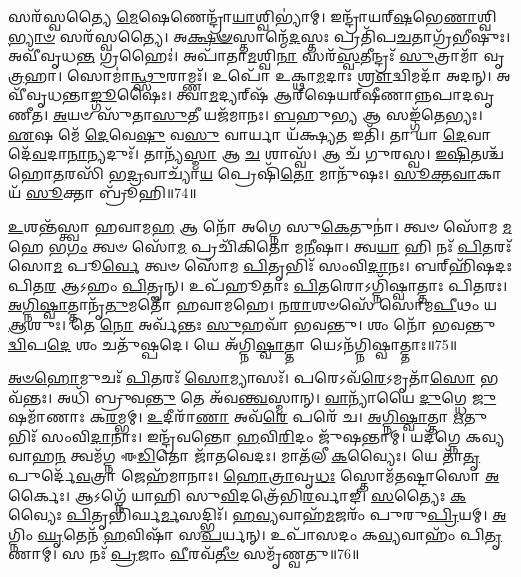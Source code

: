 𑌸𑌰᳴𑌸𑍍𑌵𑌤𑍍𑌯𑍈 \ul{𑌮𑍇}\-𑌷𑍇𑌣𑍇𑌨𑍍𑌦𑍍𑌰𑌾᳴\-\ul{𑌯𑌾}\-𑌶𑍍𑌵𑌿𑌭𑍍𑌯𑌾॑𑌮𑍍।
𑌇𑌨𑍍𑌦𑍍𑌰𑌾᳴𑌯𑌰𑍍‌\mbox{}\-\ul{𑌷}\-𑌭𑍇\-\ul{𑌣𑌾}\-𑌶𑍍𑌵𑌿\-\ul{𑌭𑍍𑌯𑌾}\-\-\ul{𑍞} 𑌸𑌰᳴𑌸𑍍𑌵𑌤𑍍𑌯𑍈।
𑌅\-\ul{𑌕𑍍𑌷}\-\-\ul{𑍟}\-𑌸𑍍𑌤𑌾𑌨𑍍𑌮𑍇᳴\-\ul{𑌦}\-𑌸𑍍𑌤𑌃 𑌪𑍍𑌰𑌤𑌿᳴\-𑌪\-\ul{𑌚}\-𑌤𑌾𑌗𑍍𑌰᳴𑌭𑍀𑌷𑍁𑌃।
𑌅𑌵𑍀᳴𑌵𑍃𑌧\-\ul{𑌨𑍍𑌤} 𑌗𑍍𑌰𑌹𑍈𑌃॑।
𑌅𑌪𑌾᳴𑌤𑌾\-\ul{𑌮}\-𑌶𑍍𑌵𑌿\-\ul{𑌨𑌾} 𑌸𑌰᳴\-\ul{𑌸𑍍𑌵}\-𑌤𑍀𑌨𑍍𑌦𑍍𑌰𑌃᳴ \ul{𑌸𑍁}\-𑌤𑍍𑌰𑌾𑌮𑌾᳴ 𑌵𑍃\-\ul{𑌤𑍍𑌰}\-𑌹𑌾।
𑌸𑍋𑌮𑌾॑\-\ul{𑌨𑍍𑌥𑍍𑌸𑍁}\-𑌰𑌾𑌮𑍍𑌣𑌃᳴।
𑌉𑌪𑍋᳴ 𑌉𑌕𑍍𑌥𑌾\-\ul{𑌮}\-𑌦𑌾𑌃 \ul{𑌶𑍍𑌰𑍗}\-𑌦𑍍𑌵𑌿𑌮𑌦𑌾᳴ 𑌅𑌦𑌨𑍍।
𑌅𑌵𑍀᳴𑌵𑍃𑌧𑌨𑍍𑌤𑌾\-\ul{𑌙𑍍𑌗𑍂}\-𑌷𑍈𑌃।
𑌤𑍍𑌵𑌾\-\ul{𑌮}\-𑌦𑍍𑌯𑌰𑍍‌\mbox{}𑌷᳴ 𑌆𑌰𑍍‌\mbox{}𑌷𑍇𑌯𑌰𑍍‌\mbox{}𑌷𑍀𑌣𑌾𑌨𑍍𑌨𑌪𑌾𑌦𑌵𑍃𑌣𑍀𑌤।
\-\ul{𑌅}\-𑌯𑍞 𑌸𑍁᳴𑌤𑌾\-\ul{𑌸𑍁}\-𑌤𑍀 𑌯𑌜᳴𑌮𑌾𑌨𑌃।
\-\ul{𑌬}\-𑌹𑍁\-\ul{𑌭𑍍𑌯} 𑌆 𑌸𑌙𑍍𑌗᳴𑌤𑍇𑌭𑍍𑌯𑌃।
\-\ul{𑌏}\-𑌷 𑌮𑍇᳴ \ul{𑌦𑍇}\-𑌵𑍇\-\ul{𑌷𑍁} 𑌵\-\ul{𑌸𑍁} 𑌵𑌾𑌰𑍍𑌯𑌾 𑌯᳴𑌕𑍍𑌷𑍍𑌯\-\ul{𑌤} 𑌇𑌤𑌿᳴।
𑌤𑌾 𑌯𑌾 \ul{𑌦𑍇}\-𑌵𑌾 𑌦𑍇᳴\-\ul{𑌵}\-𑌦𑌾\-\ul{𑌨𑌾}\-𑌨𑍍𑌯𑌦𑍁𑌃᳴।
𑌤𑌾𑌨𑍍𑌯᳴\-\ul{𑌸𑍍𑌮𑌾} 𑌆 \ul{𑌚} 𑌶𑌾𑌸𑍍𑌵᳴।
𑌆 𑌚᳴ 𑌗𑍁𑌰𑌸𑍍𑌵।
\-\ul{𑌇}\-\-\ul{𑌷𑌿}\-𑌤𑌶𑍍𑌚᳴ 𑌹𑍋\-\ul{𑌤}\-𑌰𑌸𑌿᳴ 𑌭\-\ul{𑌦𑍍𑌰}\-𑌵𑌾𑌚𑍍𑌯𑌾᳴\-\ul{𑌯} 𑌪𑍍𑌰𑍇𑌷𑌿᳴\-\ul{𑌤𑍋} 𑌮𑌾𑌨𑍁᳴𑌷𑌃।
\-\ul{𑌸𑍂}\-\-\ul{𑌕𑍍𑌤}\-\-\ul{𑌵𑌾}\-𑌕𑌾𑌯᳴ \ul{𑌸𑍂}\-𑌕𑍍𑌤𑌾 𑌬𑍍𑌰𑍂᳴𑌹𑌿॥74॥\anuvakamend[𑌇𑌨𑍍𑌦𑍍𑌰𑌾᳴\-\ul{𑌯} 𑌯𑌜᳴𑌮𑌾𑌨𑌃 \ul{𑌸}\-𑌪𑍍𑌤 𑌚᳴]

\-\ul{𑌉}\-𑌶𑌨𑍍𑌤᳴𑌸𑍍𑌤𑍍𑌵𑌾 𑌹𑌵𑌾𑌮\-\ul{𑌹} 𑌆 𑌨𑍋᳴ 𑌅𑌗𑍍𑌨𑍇 𑌸𑍁\-\ul{𑌕𑍇}\-𑌤𑍁𑌨𑌾॑।
𑌤𑍍𑌵𑍞 𑌸𑍋᳴𑌮 \ul{𑌮}\-𑌹𑍇 𑌭\-\ul{𑌗𑌂} 𑌤𑍍𑌵𑍞 𑌸𑍋᳴\-\ul{𑌮} 𑌪𑍍𑌰𑌚𑌿᳴𑌕𑌿𑌤𑍋 𑌮\-\ul{𑌨𑍀}\-𑌷𑌾।
𑌤𑍍𑌵\-\ul{𑌯𑌾} 𑌹𑌿 𑌨𑌃᳴ \ul{𑌪𑌿}\-𑌤𑌰𑌃᳴ 𑌸𑍋\-\ul{𑌮} 𑌪𑍂\-\ul{𑌰𑍍𑌵𑍇} 𑌤𑍍𑌵𑍞 𑌸𑍋᳴𑌮 \ul{𑌪𑌿}\-𑌤𑍃𑌭𑌿𑌃᳴ 𑌸𑌂𑌵𑌿\-\ul{𑌦𑌾}\-𑌨𑌃।
𑌬𑌰𑍍‌\mbox{}𑌹𑌿᳴𑌷𑌦𑌃 𑌪𑌿𑌤\-\ul{𑌰} 𑌆𑌽𑌹𑌂 \ul{𑌪𑌿}\-𑌤𑍄𑌨𑍍।
𑌉𑌪᳴𑌹𑍂𑌤𑌾𑌃 \ul{𑌪𑌿}\-𑌤𑌰𑍋\-𑌽𑌗𑍍𑌨𑌿᳴𑌷𑍍𑌵𑌾𑌤𑍍𑌤𑌾𑌃 𑌪𑌿𑌤𑌰𑌃।
\-\ul{𑌅}\-\-\ul{𑌗𑍍𑌨𑌿}\-\-\ul{𑌷𑍍𑌵𑌾}\-𑌤𑍍𑌤𑌾𑌨𑍃᳴\-\ul{𑌤𑍁}\-𑌮𑌤𑍋᳴ 𑌹𑌵𑌾𑌮𑌹𑍇।
𑌨\-\ul{𑌰𑌾}\-𑌶𑍞𑌸𑍇᳴ 𑌸𑍋𑌮\-\ul{𑌪𑍀}\-𑌥𑌂 𑌯 \ul{𑌆}\-𑌶𑍁𑌃।
𑌤𑍇 \ul{𑌨𑍋} 𑌅𑌰𑍍𑌵᳴𑌨𑍍𑌤𑌃 \ul{𑌸𑍁}\-𑌹𑌵𑌾᳴ 𑌭𑌵𑌨𑍍𑌤𑍁।
𑌶𑌂 𑌨𑍋᳴ 𑌭𑌵𑌨𑍍𑌤𑍁 \ul{𑌦𑍍𑌵𑌿}\-𑌪\-\ul{𑌦𑍇} 𑌶𑌂 𑌚𑌤𑍁᳴𑌷𑍍𑌪𑌦𑍇।
𑌯𑍇 𑌅᳴𑌗𑍍𑌨𑌿\-\ul{𑌷𑍍𑌵𑌾}\-𑌤𑍍𑌤𑌾 𑌯𑍇𑌽𑌨᳴𑌗𑍍𑌨𑌿𑌷𑍍𑌵𑌾𑌤𑍍𑌤𑌾𑌃॥75॥

\-\ul{𑌅}\-\-\ul{𑍞}\-\-\ul{𑌹𑍋}\-𑌮𑍁𑌚𑌃᳴ \ul{𑌪𑌿}\-𑌤𑌰𑌃᳴ \ul{𑌸𑍋}\-𑌮𑍍𑌯𑌾𑌸𑌃᳴।
𑌪𑌰𑍇𑌽𑌵᳴\-\ul{𑌰𑍇}\-\-𑌽𑌮𑍃𑌤𑌾᳴\-\ul{𑌸𑍋} 𑌭𑌵᳴𑌨𑍍𑌤𑌃।
𑌅𑌧𑌿᳴ 𑌬𑍍𑌰𑍁𑌵\-\ul{𑌨𑍍𑌤𑍁} 𑌤𑍇 𑌅᳴𑌵\-\ul{𑌨𑍍𑌤𑍍𑌵}\-𑌸𑍍𑌮𑌾𑌨𑍍।
\-\ul{𑌵𑌾}\-𑌨𑍍𑌯𑌾᳴𑌯𑍈 \ul{𑌦𑍁}\-𑌗𑍍𑌧𑍇 \ul{𑌜𑍁}\-𑌷𑌮𑌾᳴𑌣𑌾𑌃 𑌕\-\ul{𑌰}\-𑌮𑍍𑌭𑌮𑍍।
\-\ul{𑌉}\-𑌦𑍀𑌰𑌾᳴\-\ul{𑌣𑌾} 𑌅𑌵᳴\-\ul{𑌰𑍇} 𑌪𑌰𑍇᳴ 𑌚।
\-\ul{𑌅}\-\-\ul{𑌗𑍍𑌨𑌿}\-\-\ul{𑌷𑍍𑌵𑌾}\-𑌤𑍍𑌤𑌾 \ul{𑌋}\-𑌤𑍁𑌭𑌿𑌃᳴ 𑌸𑌂𑌵𑌿\-\ul{𑌦𑌾}\-𑌨𑌾𑌃।
𑌇𑌨𑍍𑌦𑍍𑌰᳴𑌵𑌨𑍍𑌤𑍋 \ul{𑌹}\-𑌵𑌿\-\ul{𑌰𑌿}\-𑌦𑌂 𑌜𑍁᳴𑌷𑌨𑍍𑌤𑌾𑌮𑍍।
𑌯𑌦᳴𑌗𑍍𑌨𑍇 𑌕𑌵𑍍𑌯𑌵𑌾𑌹\-\ul{𑌨} 𑌤𑍍𑌵𑌮᳴𑌗𑍍𑌨 𑌈\-\ul{𑌡𑌿}\-𑌤𑍋 𑌜𑌾᳴𑌤𑌵𑍇𑌦𑌃।
𑌮𑌾𑌤᳴𑌲𑍀 \ul{𑌕}\-𑌵𑍍𑌯𑍈𑌃।
𑌯𑍇 𑌤𑌾᳴\-\ul{𑌤𑍃}\-𑌪𑍁𑌰𑍍𑌦𑍇᳴\-\ul{𑌵}\-𑌤𑍍𑌰𑌾 𑌜𑍇𑌹᳴𑌮𑌾𑌨𑌾𑌃।
\-\ul{𑌹𑍋}\-\-\ul{𑌤𑍍𑌰𑌾}\-𑌵𑍃\-\ul{𑌧𑌃} 𑌸𑍍𑌤𑍋𑌮᳴𑌤𑌷𑍍𑌟𑌾𑌸𑍋 \ul{𑌅}\-𑌰𑍍𑌕𑍈𑌃।
𑌆𑌽𑌗𑍍𑌨𑍇᳴ 𑌯𑌾𑌹𑌿 𑌸𑍁\-\ul{𑌵𑌿}\-𑌦𑌤𑍍𑌰𑍇᳴𑌭𑌿\-\ul{𑌰}\-𑌰𑍍𑌵𑌾𑌙𑍍।
\-\ul{𑌸}\-𑌤𑍍𑌯𑍈𑌃 \ul{𑌕}\-𑌵𑍍𑌯𑍈𑌃 \ul{𑌪𑌿}\-𑌤𑍃𑌭𑌿᳴𑌰𑍍𑌘\-\ul{𑌰𑍍𑌮}\-𑌸𑌦𑍍𑌭𑌿𑌃᳴।
\-\ul{𑌹}\-\-\ul{𑌵𑍍𑌯}\-𑌵𑌾𑌹᳴\-\ul{𑌮}\-𑌜𑌰𑌂᳴ 𑌪𑍁𑌰𑍁\-\ul{𑌪𑍍𑌰𑌿}\-𑌯𑌮𑍍।
\-\ul{𑌅}\-𑌗𑍍𑌨𑌿𑌂 \ul{𑌘𑍃}\-𑌤𑍇𑌨᳴ \ul{𑌹}\-𑌵𑌿𑌷𑌾᳴ 𑌸\-\ul{𑌪}\-𑌰𑍍𑌯𑌨𑍍।
𑌉𑌪𑌾᳴𑌸𑌦𑌂 𑌕\-\ul{𑌵𑍍𑌯}\-𑌵𑌾𑌹𑌂᳴ 𑌪𑌿\-\ul{𑌤𑍃}\-𑌣𑌾𑌮𑍍।
𑌸 𑌨𑌃᳴ \ul{𑌪𑍍𑌰}\-𑌜𑌾𑌂 \ul{𑌵𑍀}\-𑌰𑌵᳴\-\ul{𑌤𑍀}\-\-\ul{𑍞} 𑌸𑌮𑍃᳴𑌣𑍍𑌵𑌤𑍁॥76॥\anuvakamend[𑌅𑌨᳴𑌗𑍍𑌨𑌿𑌷𑍍𑌵𑌾\-\ul{𑌤𑍍𑌤𑌾} 𑌜𑍇𑌹᳴𑌮𑌾𑌨𑌾𑌃 \ul{𑌸}\-𑌪𑍍𑌤 𑌚᳴]

